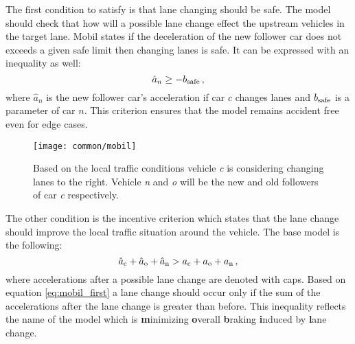 		The first condition to satisfy is that lane changing should be safe. The model should check that how will a possible lane change effect the upstream vehicles in the target lane. Mobil states if the deceleration of the new follower car does not exceeds a given safe limit then changing lanes is safe. It can be expressed with an inequality as well:
		\begin{equation}
			\hat{a}_{n}\geq -b_{\rm safe}\,,
		\end{equation}
		where $\hat{a}_{n}$ is the new follower car's acceleration if car $c$ changes lanes and $b_{\rm safe}$ is a parameter of car $n$. This criterion ensures that the model remains accident free even for edge cases.
			\begin{figure}[ht]
				\centering
				\texttt{[image: common/mobil]}
				\caption{Based on the local traffic conditions vehicle \textit{c} is considering changing lanes  to the right. Vehicle \textit{n} and \textit{o} will be the new and old followers of car \textit{c} respectively.}
				\label{fig:mobil}
			\end{figure}
			The other condition is the incentive criterion which states that the lane change should improve the local traffic situation around the vehicle.  The base model is the following:
			\begin{equation}
				\hat{a}_{\rm c} + \hat{a}_{\rm o} + \hat{a}_{\rm n} > a_{\rm c} + a_{\rm o} + a_{\rm n}\,,
				\label{eq:mobil_first}
			\end{equation}
			where accelerations after a possible lane change are denoted with caps.
			Based on equation \ref{eq:mobil_first} a lane change should occur only if the sum of the accelerations after the lane change is greater than before. This inequality reflects the name of the model which is \textbf{m}inimizing \textbf{o}verall \textbf{b}raking \textbf{i}nduced by \textbf{l}ane change.

